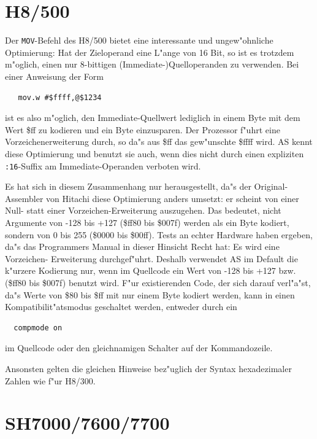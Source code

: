 \documentclass[12pt,a4paper,twoside]{report}
\newcommand{\tty}[1]{{\tt #1}}
\newcommand{\asname}{AS}
\begin{document}

\section{H8/500}

Der {\tt MOV}-Befehl des H8/500 bietet eine interessante und ungew"ohnliche
Optimierung: Hat der Zieloperand eine L"ange von 16 Bit, so ist es trotzdem
m"oglich, einen nur 8-bittigen (Immediate-)Quelloperanden zu verwenden.  Bei
einer Anweisung der Form
\begin{verbatim}
   mov.w #$ffff,@$1234
\end{verbatim}
ist es also m"oglich, den Immediate-Quellwert lediglich in einem Byte mit
dem Wert \$ff zu kodieren und ein Byte einzusparen.  Der Prozessor f"uhrt
eine Vorzeichenerweiterung durch, so da"s aus \$ff das gew"unschte \$ffff
wird.  \asname{} kennt diese Optimierung und benutzt sie auch, wenn dies nicht
durch einen expliziten \tty{:16}-Suffix am Immediate-Operanden verboten
wird.

Es hat sich in diesem Zusammenhang nur herausgestellt, da"s der Original-Assembler
von Hitachi diese Optimierung anders umsetzt: er scheint von einer Null- statt
einer Vorzeichen-Erweiterung auszugehen.  Das bedeutet, nicht Argumente von
-128 bis +127 (\$ff80 bis \$007f) werden als ein Byte kodiert, sondern von 0 bis
255 (\$0000 bis \$00ff).  Tests an echter Hardware haben ergeben, da"s
das Programmers Manual in dieser Hinsicht Recht hat: Es wird eine Vorzeichen-
Erweiterung durchgef"uhrt.  Deshalb verwendet \asname{} im Default die k"urzere
Kodierung nur, wenn im Quellcode ein Wert von -128 bis +127 bzw. (\$ff80 bis
\$007f) benutzt wird.  F"ur existierenden Code, der sich darauf verl"a"st,
da"s Werte von \$80 bis \$ff mit nur einem Byte kodiert werden, kann in einen
Kompatibilit"atsmodus geschaltet werden, entweder durch ein
\begin{verbatim}
  compmode on
\end{verbatim}
im Quellcode oder den gleichnamigen Schalter auf der Kommandozeile.

Ansonsten gelten die gleichen Hinweise bez"uglich der Syntax hexadezimaler
Zahlen wie f"ur H8/300.


\section{SH7000/7600/7700}
\end{document}

